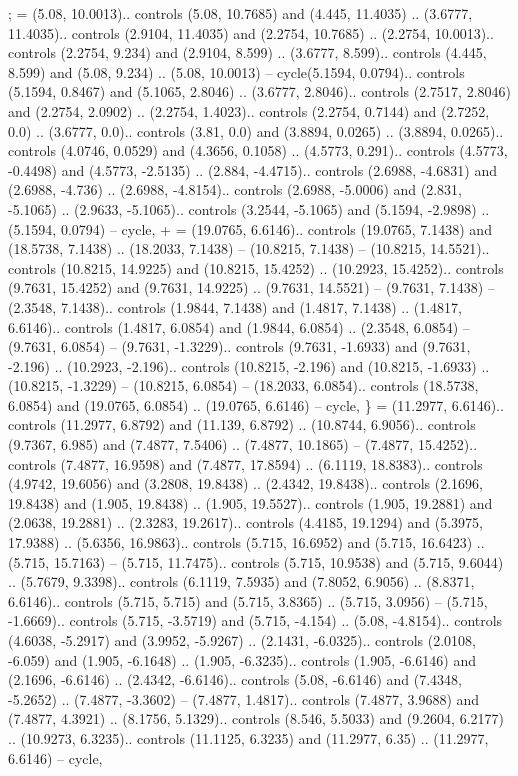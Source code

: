 {;} = {(5.08, 10.0013).. controls (5.08, 10.7685) and (4.445, 11.4035) .. (3.6777, 11.4035).. controls (2.9104, 11.4035) and (2.2754, 10.7685) .. (2.2754, 10.0013).. controls (2.2754, 9.234) and (2.9104, 8.599) .. (3.6777, 8.599).. controls (4.445, 8.599) and (5.08, 9.234) .. (5.08, 10.0013) -- cycle(5.1594, 0.0794).. controls (5.1594, 0.8467) and (5.1065, 2.8046) .. (3.6777, 2.8046).. controls (2.7517, 2.8046) and (2.2754, 2.0902) .. (2.2754, 1.4023).. controls (2.2754, 0.7144) and (2.7252, 0.0) .. (3.6777, 0.0).. controls (3.81, 0.0) and (3.8894, 0.0265) .. (3.8894, 0.0265).. controls (4.0746, 0.0529) and (4.3656, 0.1058) .. (4.5773, 0.291).. controls (4.5773, -0.4498) and (4.5773, -2.5135) .. (2.884, -4.4715).. controls (2.6988, -4.6831) and (2.6988, -4.736) .. (2.6988, -4.8154).. controls (2.6988, -5.0006) and (2.831, -5.1065) .. (2.9633, -5.1065).. controls (3.2544, -5.1065) and (5.1594, -2.9898) .. (5.1594, 0.0794) -- cycle},
{+} = {(19.0765, 6.6146).. controls (19.0765, 7.1438) and (18.5738, 7.1438) .. (18.2033, 7.1438) -- (10.8215, 7.1438) -- (10.8215, 14.5521).. controls (10.8215, 14.9225) and (10.8215, 15.4252) .. (10.2923, 15.4252).. controls (9.7631, 15.4252) and (9.7631, 14.9225) .. (9.7631, 14.5521) -- (9.7631, 7.1438) -- (2.3548, 7.1438).. controls (1.9844, 7.1438) and (1.4817, 7.1438) .. (1.4817, 6.6146).. controls (1.4817, 6.0854) and (1.9844, 6.0854) .. (2.3548, 6.0854) -- (9.7631, 6.0854) -- (9.7631, -1.3229).. controls (9.7631, -1.6933) and (9.7631, -2.196) .. (10.2923, -2.196).. controls (10.8215, -2.196) and (10.8215, -1.6933) .. (10.8215, -1.3229) -- (10.8215, 6.0854) -- (18.2033, 6.0854).. controls (18.5738, 6.0854) and (19.0765, 6.0854) .. (19.0765, 6.6146) -- cycle},
{\}} = {(11.2977, 6.6146).. controls (11.2977, 6.8792) and (11.139, 6.8792) .. (10.8744, 6.9056).. controls (9.7367, 6.985) and (7.4877, 7.5406) .. (7.4877, 10.1865) -- (7.4877, 15.4252).. controls (7.4877, 16.9598) and (7.4877, 17.8594) .. (6.1119, 18.8383).. controls (4.9742, 19.6056) and (3.2808, 19.8438) .. (2.4342, 19.8438).. controls (2.1696, 19.8438) and (1.905, 19.8438) .. (1.905, 19.5527).. controls (1.905, 19.2881) and (2.0638, 19.2881) .. (2.3283, 19.2617).. controls (4.4185, 19.1294) and (5.3975, 17.9388) .. (5.6356, 16.9863).. controls (5.715, 16.6952) and (5.715, 16.6423) .. (5.715, 15.7163) -- (5.715, 11.7475).. controls (5.715, 10.9538) and (5.715, 9.6044) .. (5.7679, 9.3398).. controls (6.1119, 7.5935) and (7.8052, 6.9056) .. (8.8371, 6.6146).. controls (5.715, 5.715) and (5.715, 3.8365) .. (5.715, 3.0956) -- (5.715, -1.6669).. controls (5.715, -3.5719) and (5.715, -4.154) .. (5.08, -4.8154).. controls (4.6038, -5.2917) and (3.9952, -5.9267) .. (2.1431, -6.0325).. controls (2.0108, -6.059) and (1.905, -6.1648) .. (1.905, -6.3235).. controls (1.905, -6.6146) and (2.1696, -6.6146) .. (2.4342, -6.6146).. controls (5.08, -6.6146) and (7.4348, -5.2652) .. (7.4877, -3.3602) -- (7.4877, 1.4817).. controls (7.4877, 3.9688) and (7.4877, 4.3921) .. (8.1756, 5.1329).. controls (8.546, 5.5033) and (9.2604, 6.2177) .. (10.9273, 6.3235).. controls (11.1125, 6.3235) and (11.2977, 6.35) .. (11.2977, 6.6146) -- cycle},
